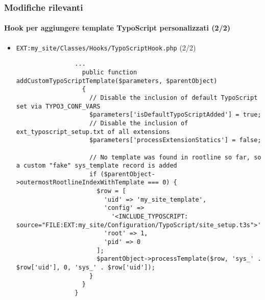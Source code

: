\begin{frame}[fragile]
	\frametitle{Modifiche rilevanti}
	\framesubtitle{Hook per aggiungere template TypoScript personalizzati (2/2)}

	\lstset{basicstyle=\tiny\ttfamily}

	\begin{itemize}
		\item \texttt{EXT:my\_site/Classes/Hooks/TypoScriptHook.php} (2/2)

			\begin{lstlisting}
				...
				  public function addCustomTypoScriptTemplate($parameters, $parentObject)
				  {
				    // Disable the inclusion of default TypoScript set via TYPO3_CONF_VARS
				    $parameters['isDefaultTypoScriptAdded'] = true;
				    // Disable the inclusion of ext_typoscript_setup.txt of all extensions
				    $parameters['processExtensionStatics'] = false;

				    // No template was found in rootline so far, so a custom "fake" sys_template record is added
				    if ($parentObject->outermostRootlineIndexWithTemplate === 0) {
				      $row = [
				        'uid' => 'my_site_template',
				        'config' =>
					      '<INCLUDE_TYPOSCRIPT: source="FILE:EXT:my_site/Configuration/TypoScript/site_setup.t3s">',
				        'root' => 1,
				        'pid' => 0
				      ];
				      $parentObject->processTemplate($row, 'sys_' . $row['uid'], 0, 'sys_' . $row['uid']);
				    }
				  }
				}
			\end{lstlisting}

	\end{itemize}

\end{frame}

